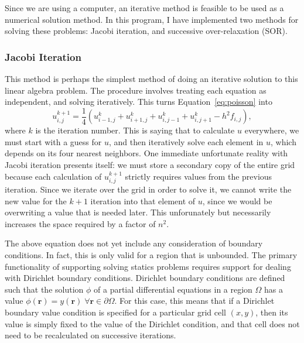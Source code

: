 Since we are using a computer, an iterative method is feasible to be used as a numerical solution method. In this
program, I have implemented two methods for solving these problems: Jacobi iteration, and successive over-relaxation (SOR).

\subsubsection{Jacobi Iteration}
This method is perhaps the simplest method of doing an iterative solution to this linear algebra problem. The procedure
involves treating each equation as independent, and solving iteratively. This turns Equation~\ref{eq:poisson} into
\begin{equation} \label{eq:jacobi}
u_{i,j}^{k+1} = \frac{1}{4}(u_{i-1,j}^{k} + u_{i+1,j}^{k} + u_{i,j-1}^{k} + u_{i,j+1}^{k} - h^2f_{i,j}),
\end{equation}
where $k$ is the iteration number. This is saying that to calculate $u$ everywhere, we must start with a guess for $u$,
and then iteratively solve each element in $u$, which depends on its four nearest neighbors. One immediate unfortunate
reality with Jacobi iteration presents itself: we must store a secondary copy of the entire grid because each calculation
of $u_{i,j}^{k+1}$ strictly requires values from the previous iteration. Since we iterate over the grid in order to solve
it, we cannot write the new value for the $k+1$ iteration into that element of $u$, since we would be overwriting a value
that is needed later. This unforunately but necessarily increases the space required by a factor of $n^2$.


The above equation does not yet include any consideration of boundary conditions. In fact, this is only valid for a region
that is unbounded. The primary functionality of supporting solving statics problems requires support for dealing with
Dirichlet boundary conditions. Dirichlet boundary conditions are defined such that the solution $\phi$ of a partial
differential equations in a region $\Omega$ has a value $\phi(\mathbf{r}) = y(\mathbf{r}) \; \forall \mathbf{r} \in \partial \Omega$.
For this case, this means that if a Dirichlet boundary value condition is specified for a particular grid cell $(x,y)$,
then its value is simply fixed to the value of the Dirichlet condition, and that cell does not need to be recalculated on
successive iterations.

